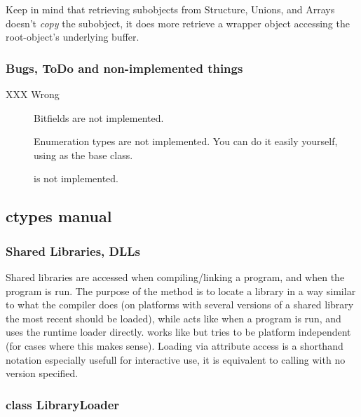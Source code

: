 Keep in mind that retrieving subobjects from Structure, Unions, and
Arrays doesn't \emph{copy} the subobject, it does more retrieve a wrapper
object accessing the root-object's underlying buffer.


\subsubsection{Bugs, ToDo and non-implemented things\label{ctypes-bugs-todo-non-implemented-things}}
\begin{description}
\item[{XXX Wrong}] 
Bitfields are not implemented.

Enumeration types are not implemented. You can do it easily
yourself, using  as the base class.

 is not implemented.
\end{description}


\subsection{ctypes manual\label{ctypes-ctypes-manual}}


\subsubsection{Shared Libraries, DLLs\label{ctypes-shared-libraries-dlls}}

Shared libraries are accessed when compiling/linking a program, and
when the program is run. The purpose of the  method is to
locate a library in a way similar to what the compiler does (on
platforms with several versions of a shared library the most recent
should be loaded), while  acts like when a program is run, and
uses the runtime loader directly.  works like 
but tries to be platform independent (for cases where this makes
sense). Loading via attribute access is a shorthand notation
especially usefull for interactive use, it is equivalent to calling
 with no version specified.


\subsubsection{class LibraryLoader\label{ctypes-class-libraryloader}}

